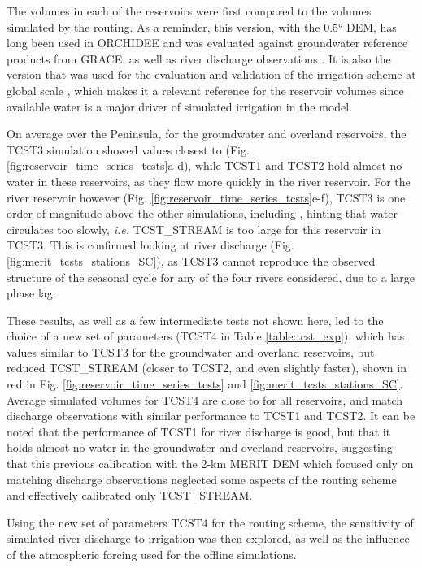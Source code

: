 The volumes in each of the reservoirs were first compared to the volumes simulated by the \std routing. As a reminder, this version, with the 0.5° DEM, has long been used in ORCHIDEE and was evaluated against groundwater reference products from GRACE, as well as river discharge observations  \citep{ngo-duc_53-year_2005, ngo-duc_validation_2007}.
It is also the version that was used for the evaluation and validation of the irrigation scheme at global scale \citep{arboleda-obando_validation_2024}, which makes it a relevant reference for the reservoir volumes since available water is a major driver of simulated irrigation in the model. 

On average over the Peninsula, for the groundwater and overland reservoirs, the TCST3 simulation showed values closest to \std (Fig. \ref{fig:reservoir_time_series_tcsts}a-d), while TCST1 and TCST2 hold almost no water in these reservoirs, as they flow more quickly in the river reservoir. 
For the river reservoir however (Fig. \ref{fig:reservoir_time_series_tcsts}e-f), TCST3 is one order of magnitude above the other simulations, including \std, hinting that water circulates too slowly, \textit{i.e.}  TCST\_STREAM is too large for this reservoir in TCST3. This is confirmed looking at river discharge (Fig. \ref{fig:merit_tcsts_stations_SC}), as TCST3 cannot reproduce the observed structure of the seasonal cycle for any of the four rivers considered, due to a large phase lag. 

These results, as well as a few intermediate tests not shown here, led to the choice of a new set of parameters (TCST4 in Table \ref{table:tcst_exp}), which has values similar to TCST3 for the groundwater and overland reservoirs, but reduced TCST\_STREAM (closer to TCST2, and even slightly faster), shown in red in Fig. \ref{fig:reservoir_time_series_tcsts} and \ref{fig:merit_tcsts_stations_SC}.
Average simulated volumes for TCST4 are close to \std for all reservoirs, and match discharge observations with similar performance to TCST1 and TCST2.
It can be noted that the performance of TCST1 for river discharge is good, but that it holds almost no water in the groundwater and overland reservoirs, suggesting that this previous calibration with the 2-km MERIT DEM which focused only on matching discharge observations \citep{kilic_evaluation_2023} neglected some aspects of the routing scheme and effectively calibrated only TCST\_STREAM.

Using the new set of parameters TCST4 for the routing scheme, the sensitivity of simulated river discharge to irrigation was then explored, as well as the influence of the atmospheric forcing used for the offline simulations.

